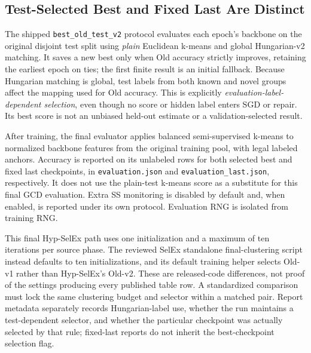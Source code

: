 \documentclass[conference]{IEEEtran}
\newcommand{\code}[1]{\texttt{#1}}
\begin{document}
\subsection{Test-Selected Best and Fixed Last Are Distinct}
The shipped \code{best\_old\_test\_v2} protocol evaluates each epoch's backbone on the original disjoint test split using \emph{plain} Euclidean k-means and global Hungarian-v2 matching. It saves a new best only when Old accuracy strictly improves, retaining the earliest epoch on ties; the first finite result is an initial fallback. Because Hungarian matching is global, test labels from both known and novel groups affect the mapping used for Old accuracy. This is explicitly \emph{evaluation-label-dependent selection}, even though no score or hidden label enters SGD or repair. Its best score is not an unbiased held-out estimate or a validation-selected result.

After training, the final evaluator applies balanced semi-supervised k-means to normalized backbone features from the original training pool, with legal labeled anchors. Accuracy is reported on its unlabeled rows for both selected best and fixed last checkpoints, in \code{evaluation.json} and \code{evaluation\_last.json}, respectively. It does not use the plain-test k-means score as a substitute for this final GCD evaluation. Extra SS monitoring is disabled by default and, when enabled, is reported under its own protocol. Evaluation RNG is isolated from training RNG.

This final Hyp-SelEx path uses one initialization and a maximum of ten iterations per source phase. The reviewed SelEx standalone final-clustering script instead defaults to ten initializations, and its default training helper selects Old-v1 rather than Hyp-SelEx's Old-v2. These are released-code differences, not proof of the settings producing every published table row. A standardized comparison must lock the same clustering budget and selector within a matched pair. Report metadata separately records Hungarian-label use, whether the run maintains a test-dependent selector, and whether the particular checkpoint was actually selected by that rule; fixed-last reports do not inherit the best-checkpoint selection flag.
\end{document}
